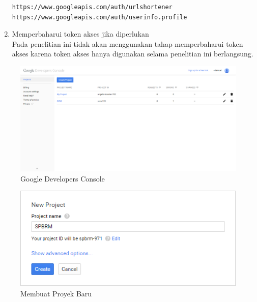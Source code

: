 \begin{enumerate}
\begin{lstlisting}
https://www.googleapis.com/auth/urlshortener
https://www.googleapis.com/auth/userinfo.profile
\end{lstlisting}
\item Memperbaharui token akses jika diperlukan\\
Pada penelitian ini tidak akan menggunakan tahap memperbaharui token akses karena token akses hanya digunakan selama penelitian ini berlangsung.
\end{enumerate}

\begin{figure}[H]
\centering
\includegraphics[scale=0.6]{Gambar/GDC.png}
\caption[Google Developers Console]{Google Developers Console} 
\label{fig:gdc}
\end{figure}

\begin{figure}[H]
\centering
\includegraphics[scale=1]{Gambar/newproject.png}
\caption[Membuat Proyek Baru]{Membuat Proyek Baru} 
\label{fig:newproject}
\end{figure}

